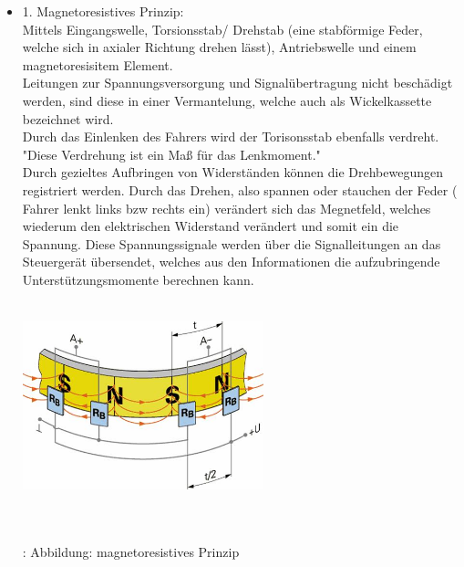 \documentclass{article}
\begin{document}
				\begin{itemize}
					\item 1. Magnetoresistives Prinzip:\\
							 Mittels Eingangswelle, Torsionsstab/ Drehstab (eine stabförmige Feder, welche sich in axialer Richtung drehen lässt), Antriebswelle und einem magnetoresisitem Element. \\
							 Leitungen zur Spannungsversorgung und Signalübertragung nicht beschädigt werden, sind diese in einer Vermantelung, welche auch als Wickelkassette bezeichnet wird.\\
							 
							 Durch das Einlenken des Fahrers wird der Torisonsstab ebenfalls verdreht. "Diese Verdrehung ist ein Maß für das Lenkmoment."\cite{TS12}\\
							 Durch gezieltes Aufbringen von Widerständen können die Drehbewegungen registriert werden. Durch das Drehen, also spannen oder stauchen der Feder ( Fahrer lenkt links bzw rechts ein) verändert sich das Megnetfeld, welches wiederum den elektrischen Widerstand verändert und somit ein die Spannung. Diese Spannungssignale werden über die Signalleitungen an das Steuergerät übersendet, welches aus den Informationen die aufzubringende Unterstützungsmomente berechnen kann.
										 
							\begin{center}
								\includegraphics[width=7cm, height=6cm] {Images/Kapitel5/lenkdrehmomentsensor.png}
								\caption {\\\cite{TS13}: Abbildung: magnetoresistives Prinzip}
							\end{center}			 
							\\
							 

\end{itemize}
\end{document}
